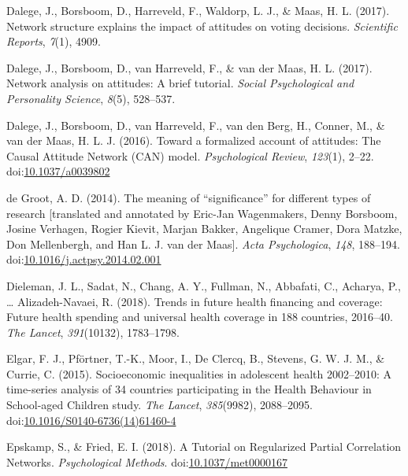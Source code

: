 \documentclass[english,floatsintext,]{apa6}
\theoremstyle{definition}
\theoremstyle{definition}
\theoremstyle{definition}
\theoremstyle{remark}
\begin{document}
\hypertarget{ref-dalegeNetworkStructureExplains2017}{}
Dalege, J., Borsboom, D., Harreveld, F., Waldorp, L. J., \& Maas, H. L.
(2017). Network structure explains the impact of attitudes on voting
decisions. \emph{Scientific Reports}, \emph{7}(1), 4909.

\hypertarget{ref-dalegeNetworkAnalysisAttitudes2017}{}
Dalege, J., Borsboom, D., van Harreveld, F., \& van der Maas, H. L.
(2017). Network analysis on attitudes: A brief tutorial. \emph{Social
Psychological and Personality Science}, \emph{8}(5), 528--537.

\hypertarget{ref-dalegeFormalizedAccountAttitudes2016}{}
Dalege, J., Borsboom, D., van Harreveld, F., van den Berg, H., Conner,
M., \& van der Maas, H. L. J. (2016). Toward a formalized account of
attitudes: The Causal Attitude Network (CAN) model. \emph{Psychological
Review}, \emph{123}(1), 2--22.
doi:\href{https://doi.org/10.1037/a0039802}{10.1037/a0039802}

\hypertarget{ref-degrootMeaningSignificanceDifferent2014}{}
de Groot, A. D. (2014). The meaning of ``significance'' for different
types of research {[}translated and annotated by Eric-Jan Wagenmakers,
Denny Borsboom, Josine Verhagen, Rogier Kievit, Marjan Bakker, Angelique
Cramer, Dora Matzke, Don Mellenbergh, and Han L. J. van der Maas{]}.
\emph{Acta Psychologica}, \emph{148}, 188--194.
doi:\href{https://doi.org/10.1016/j.actpsy.2014.02.001}{10.1016/j.actpsy.2014.02.001}

\hypertarget{ref-dielemanTrendsFutureHealth2018}{}
Dieleman, J. L., Sadat, N., Chang, A. Y., Fullman, N., Abbafati, C.,
Acharya, P., \ldots{} Alizadeh-Navaei, R. (2018). Trends in future
health financing and coverage: Future health spending and universal
health coverage in 188 countries, 2016--40. \emph{The Lancet},
\emph{391}(10132), 1783--1798.

\hypertarget{ref-elgarSocioeconomicInequalitiesAdolescent2015}{}
Elgar, F. J., Pförtner, T.-K., Moor, I., De Clercq, B., Stevens, G. W.
J. M., \& Currie, C. (2015). Socioeconomic inequalities in adolescent
health 2002--2010: A time-series analysis of 34 countries participating
in the Health Behaviour in School-aged Children study. \emph{The
Lancet}, \emph{385}(9982), 2088--2095.
doi:\href{https://doi.org/10.1016/S0140-6736(14)61460-4}{10.1016/S0140-6736(14)61460-4}

\hypertarget{ref-epskampTutorialRegularizedPartial2018}{}
Epskamp, S., \& Fried, E. I. (2018). A Tutorial on Regularized Partial
Correlation Networks. \emph{Psychological Methods}.
doi:\href{https://doi.org/10.1037/met0000167}{10.1037/met0000167}
\end{document}

